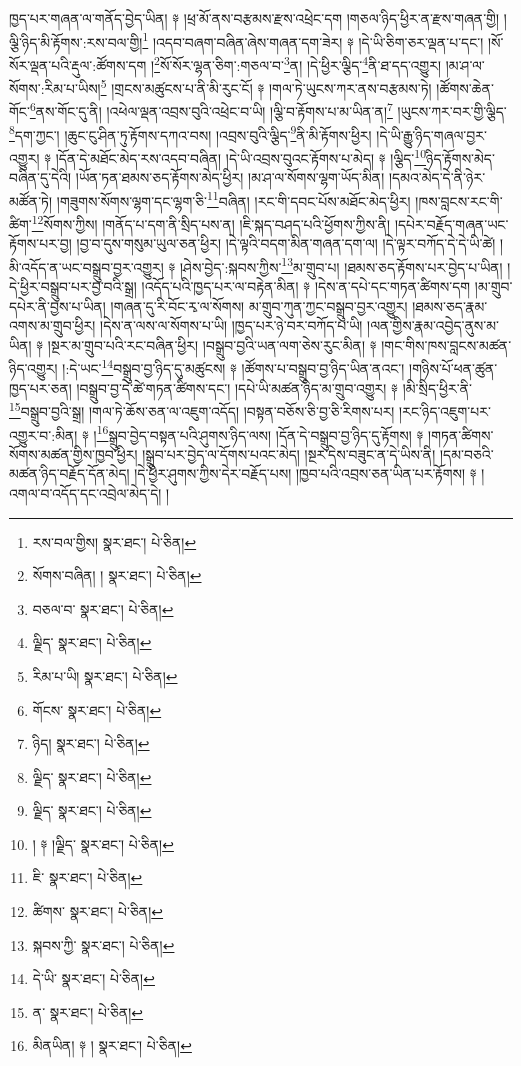 ཁྱད་པར་གཞན་ལ་གནོད་བྱེད་ཡིན། ༈ །ཕྲ་མོ་ནས་བརྩམས་རྫས་འཕྲེང་དག །གཅལ་ཉིད་ཕྱིར་ན་རྫས་གཞན་གྱི། །ལྕི་ཉིད་མི་རྟོགས་:རས་བལ་གྱི།\footnote{རས་བལ་གྱིས།  སྣར་ཐང་།  པེ་ཅིན། } །འདབ་བཞག་བཞིན་ཞེས་གཞན་དག་ཟེར། ༈ །དེ་ཡི་ཅིག་ཅར་ལྡན་པ་དང་། །སོ་སོར་ལྡན་པའི་རྡུལ་:ཚོགས་དག །\footnote{སོགས་བཞིན། །  སྣར་ཐང་།  པེ་ཅིན། }སོ་སོར་ལྷན་ཅིག་:གཅལ་བ་\footnote{བཅལ་བ་  སྣར་ཐང་།  པེ་ཅིན། }ན། །དེ་ཕྱིར་ལྕིད་\footnote{ལྗིད་  སྣར་ཐང་།  པེ་ཅིན། }ནི་ཐ་དད་འགྱུར། །མ་ཤ་ལ་སོགས་:རིམ་པ་ཡིས།\footnote{རིམ་པ་ཡི།  སྣར་ཐང་།  པེ་ཅིན། } །གྲངས་མཚུངས་པ་ནི་མི་རུང་ངོ། ༈ །གལ་ཏེ་ཡུངས་ཀར་ནས་བརྩམས་ཏེ། །ཚོགས་ཆེན་གོང་\footnote{གོངས་  སྣར་ཐང་།  པེ་ཅིན། }ནས་གོང་དུ་ནི། །འཕེལ་ལྡན་འབྲས་བུའི་འཕྲེང་བ་ཡི། །ལྕི་བ་རྟོགས་པ་མ་ཡིན་ན།\footnote{ཉིད།  སྣར་ཐང་།  པེ་ཅིན། } །ཡུངས་ཀར་བར་གྱི་ལྕིད་\footnote{ལྗིད་  སྣར་ཐང་།  པེ་ཅིན། }དག་ཀྱང་། །ཆུང་ངུ་ཤིན་ཏུ་རྟོགས་དཀའ་བས། །འབྲས་བུའི་ལྕིད་\footnote{ལྗིད་  སྣར་ཐང་།  པེ་ཅིན། }ནི་མི་རྟོགས་ཕྱིར། །དེ་ཡི་རྒྱུ་ཉིད་གཞལ་བྱར་འགྱུར། ༈ །དོན་དེ་མཐོང་མེད་རས་འདབ་བཞིན། །དེ་ཡི་འབྲས་བུའང་རྟོགས་པ་མེད། ༈ །ལྕིད་\footnote{། ༈ །ལྗིད་  སྣར་ཐང་།  པེ་ཅིན། }ཉིད་རྟོགས་མེད་བཞིན་དུ་དེའི། །ཡོན་ཏན་ཐམས་ཅད་རྟོགས་མེད་ཕྱིར། །མ་ཤ་ལ་སོགས་ལྷག་ཡོད་མིན། །དམའ་མེད་དེ་ནི་ཉེར་མཚོན་ཏེ། །གཟུགས་སོགས་ལྷག་དང་ལྷག་ཅི་\footnote{ཇི་  སྣར་ཐང་།  པེ་ཅིན། }བཞིན། །རང་གི་དབང་པོས་མཐོང་མེད་ཕྱིར། །ཁས་བླངས་རང་གི་ཚིག་\footnote{ཚིགས་  སྣར་ཐང་།  པེ་ཅིན། }སོགས་ཀྱིས། །གནོད་པ་དག་ནི་སྲིད་པས་ན། །ཇི་སྐད་བཤད་པའི་ཕྱོགས་ཀྱིས་ནི། །དཔེར་བརྗོད་གཞན་ཡང་རྟོགས་པར་བྱ། །བྱ་བ་དུས་གསུམ་ཡུལ་ཅན་ཕྱིར། །དེ་ལྟའི་བདག་མིན་གཞན་དག་ལ། །དེ་ལྟར་བཀོད་དེ་དེ་ཡི་ཚེ། །མི་འདོད་ན་ཡང་བསྒྲུབ་བྱར་འགྱུར། ༈ །ཤེས་བྱེད་:སྐབས་ཀྱིས་\footnote{སྐབས་ཀྱི་  སྣར་ཐང་།  པེ་ཅིན། }མ་གྲུབ་པ། །ཐམས་ཅད་རྟོགས་པར་བྱེད་པ་ཡིན། །དེ་ཕྱིར་བསྒྲུབ་པར་བྱ་བའི་སྒྲ། །འདོད་པའི་ཁྱད་པར་ལ་བརྟེན་མིན། ༈ །དེས་ན་དཔེ་དང་གཏན་ཚིགས་དག །མ་གྲུབ་དཔེར་ནི་བྱས་པ་ཡིན། །གཞན་དུ་རི་བོང་རྭ་ལ་སོགས། མ་གྲུབ་ཀུན་ཀྱང་བསྒྲུབ་བྱར་འགྱུར། །ཐམས་ཅད་རྣམ་འགས་མ་གྲུབ་ཕྱིར། །དེས་ན་ལས་ལ་སོགས་པ་ཡི། །ཁྱད་པར་ཉེ་བར་བཀོད་པ་ཡི། །ལན་གྱིས་རྣམ་འབྱེད་ནུས་མ་ཡིན། ༈ །སྔར་མ་གྲུབ་པའི་རང་བཞིན་ཕྱིར། །བསྒྲུབ་བྱའི་ཡན་ལག་ཅེས་རུང་མིན། ༈ །གང་གིས་ཁས་བླངས་མཚན་ཉིད་འགྱུར། །:དེ་ཡང་\footnote{དེ་ཡི་  སྣར་ཐང་།  པེ་ཅིན། }བསྒྲུབ་བྱ་ཉིད་དུ་མཚུངས། ༈ །ཚོགས་པ་བསྒྲུབ་བྱ་ཉིད་ཡིན་ནའང་། །གཉིས་པོ་ཕན་ཚུན་ཁྱད་པར་ཅན། །བསྒྲུབ་བྱ་དེ་ཚེ་གཏན་ཚིགས་དང་། །དཔེ་ཡི་མཚན་ཉིད་མ་གྲུབ་འགྱུར། ༈ །མི་སྲིད་ཕྱིར་ནི་\footnote{ན་  སྣར་ཐང་།  པེ་ཅིན། }བསྒྲུབ་བྱའི་སྒྲ། །གལ་ཏེ་ཆོས་ཅན་ལ་འཇུག་འདོད། །བསྟན་བཅོས་ཅི་བྱ་ཅི་རིགས་པར། །རང་ཉིད་འཇུག་པར་འགྱུར་བ་:མིན། ༈ །\footnote{མིནཡིན། ༈ །  སྣར་ཐང་།  པེ་ཅིན། }སྒྲུབ་བྱེད་བསྟན་པའི་ཤུགས་ཉིད་ལས། །དོན་དེ་བསྒྲུབ་བྱ་ཉིད་དུ་རྟོགས། ༈ །གཏན་ཚིགས་སོགས་མཚན་གྱིས་ཁྱབ་ཕྱིར། །སྒྲུབ་པར་བྱེད་ལ་དོགས་པའང་མེད། །སྔར་དེས་བཟུང་ན་དེ་ཡིས་ནི། །དམ་བཅའི་མཚན་ཉིད་བརྗོད་དོན་མེད། །དེ་ཕྱིར་ཤུགས་ཀྱིས་དེར་བརྗོད་པས། །ཁྱབ་པའི་འབྲས་ཅན་ཡིན་པར་རྟོགས། ༈ །འགལ་བ་འདོད་དང་འབྲེལ་མེད་དེ། །
